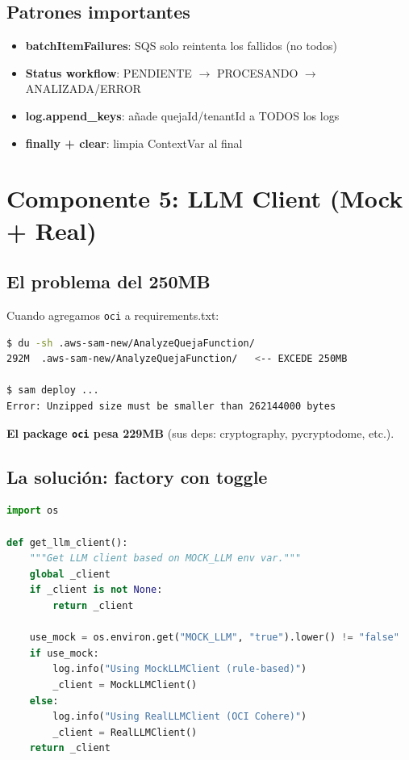 \documentclass[11pt,a4paper,oneside]{article}
\newcommand{\ok}{\textcolor{okgreen}{\textbf{\checkmark}}}
\begin{document}
\subsection{Patrones importantes}

\begin{itemize}
  \item \ok \textbf{batchItemFailures}: SQS solo reintenta los fallidos (no todos)
  \item \ok \textbf{Status workflow}: PENDIENTE $\rightarrow$ PROCESANDO $\rightarrow$ ANALIZADA/ERROR
  \item \ok \textbf{log.append\_keys}: a\~nade quejaId/tenantId a TODOS los logs
  \item \ok \textbf{finally + clear}: limpia ContextVar al final
\end{itemize}

\section{Componente 5: LLM Client (Mock + Real)}

\subsection{El problema del 250MB}

Cuando agregamos \texttt{oci} a requirements.txt:

\begin{lstlisting}[language=bash,caption={Problema}]
$ du -sh .aws-sam-new/AnalyzeQuejaFunction/
292M  .aws-sam-new/AnalyzeQuejaFunction/   <-- EXCEDE 250MB

$ sam deploy ...
Error: Unzipped size must be smaller than 262144000 bytes
\end{lstlisting}

\textbf{El package \texttt{oci} pesa 229MB} (sus deps: cryptography, pycryptodome, etc.).

\subsection{La soluci\'on: factory con toggle}

\begin{lstlisting}[language=Python,caption={services/llm\_client.py --- factory}]
import os

def get_llm_client():
    """Get LLM client based on MOCK_LLM env var."""
    global _client
    if _client is not None:
        return _client

    use_mock = os.environ.get("MOCK_LLM", "true").lower() != "false"
    if use_mock:
        log.info("Using MockLLMClient (rule-based)")
        _client = MockLLMClient()
    else:
        log.info("Using RealLLMClient (OCI Cohere)")
        _client = RealLLMClient()
    return _client
\end{lstlisting}
\end{document}
